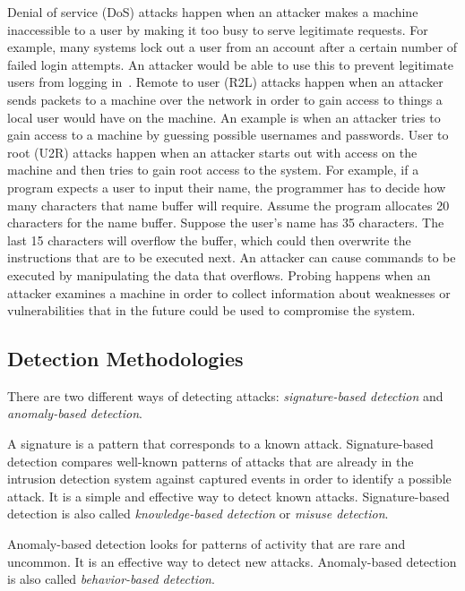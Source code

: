 \documentclass{sig-alternate}
\begin{document}
Denial of service (DoS) attacks happen when an attacker makes a machine inaccessible to a user by making it too busy to serve legitimate requests. For example, many systems lock out a user from an account after a certain number of failed login attempts. An attacker would be able to use this to prevent legitimate users from logging in~\cite{DoSAttacks}. Remote to user (R2L) attacks happen when an attacker sends packets to a machine over the network in order to gain access to things a local user would have on the machine. An example is when an attacker tries to gain access to a machine by guessing possible usernames and passwords. User to root (U2R) attacks happen when an attacker starts out with access on the machine and then tries to gain root access to the system. For example, if a program expects a user to input their name, the programmer has to decide how many characters that name buffer will require. Assume the program allocates 20 characters for the name buffer. Suppose the user's name has 35 characters. The last 15 characters will overflow the buffer, which could then overwrite the instructions that are to be executed next. An attacker can cause commands to be executed by manipulating the data that overflows. Probing happens when an attacker examines a machine in order to collect information about weaknesses or vulnerabilities that in the future could be used to compromise the system.~\cite{DBLP:journals/corr/abs-1204-1336, typesOfAttacks}




\subsection{Detection Methodologies}
\label{sec:detectionMeth}
There are two different ways of detecting attacks: \emph{signature-based detection} and \emph{anomaly-based detection}. 

A signature is a pattern that corresponds to a known attack. Signature-based detection compares well-known patterns of attacks that are already in the intrusion detection system against captured events in order to identify a possible attack. It is a simple and effective way to detect known attacks. Signature-based detection is also called \emph{knowledge-based detection} or \emph{misuse detection}.~\cite{Liao201316}

Anomaly-based detection looks for patterns of activity that are rare and uncommon. It is an effective way to detect new attacks. Anomaly-based detection is also called \emph{behavior-based detection}.~\cite{DBLP:journals/corr/abs-1204-1336}
\end{document}
